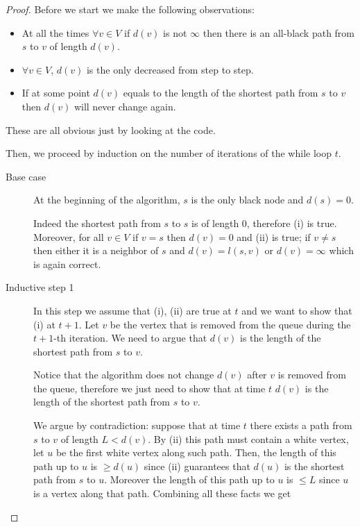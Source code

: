 \documentclass[12pt]{extarticle}
\begin{document}
\begin{proof}
    Before we start we make the following observations:
    \begin{itemize}
        \item At all the times $\forall v \in V$ if $d(v)$ is not $\infty$ then there is an all-black path from $s$ to $v$ of length $d(v)$.
        \item $\forall v \in V$, $d(v)$ is the only decreased from step to step.
        \item If at some point $d(v)$ equals to the length of the shortest path from $s$ to $v$ then $d(v)$ will never change again.
    \end{itemize}
    These are all obvious just by looking at the code.

    Then, we proceed by induction on the number of iterations of the while loop $t$.

    \begin{description}
        \item[Base case]
              At the beginning of the algorithm, $s$ is the only black node and $d(s) = 0$.

              Indeed the shortest path from $s$ to $s$ is of length 0, therefore (i) is true.
              Moreover, for all $v \in V$ if $v = s$ then $d(v) = 0$ and (ii) is true; if $v \neq s$ then either it is a neighbor of $s$ and $d(v) = l(s, v)$ or $d(v) = \infty$ which is again correct.

        \item[Inductive step 1]
              In this step we assume that (i), (ii) are true at $t$ and we want to show that (i) at $t+1$.
              Let $v$ be the vertex that is removed from the queue during the $t+1$-th iteration. We need to argue that $d(v)$ is the length of the shortest path from $s$ to $v$.

              Notice that the algorithm does not  change $d(v)$ after $v$ is removed from the queue, therefore we just need to show that at time $t$ $d(v)$ is the length of the shortest path from $s$ to $v$.

              We argue by contradiction: suppose that at time $t$ there exists a path from $s$ to $v$ of length $L < d(v)$. By (ii) this path must contain a white vertex, let $u$ be the first white vertex along such path. Then, the length of this path up to $u$ is $\geq d(u)$ since (ii) guarantees that $d(u)$ is the shortest path from $s$ to $u$.
              Moreover the length of this path up to $u$ is $\leq L$ since $u$ is a vertex along that path.
              Combining all these facts we get


\end{description}
\end{proof}
\end{document}

